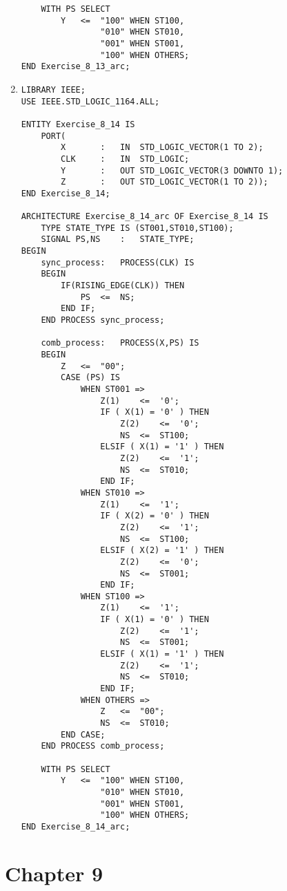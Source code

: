 \begin{enumerate}
\begin{lstlisting}
	WITH PS SELECT
		Y	<=	"100" WHEN ST100,
				"010" WHEN ST010,
				"001" WHEN ST001,
				"100" WHEN OTHERS;
END Exercise_8_13_arc;
	\end{lstlisting}
	
	\item \begin{lstlisting}
LIBRARY IEEE;
USE IEEE.STD_LOGIC_1164.ALL;

ENTITY Exercise_8_14 IS
	PORT(
		X		:	IN	STD_LOGIC_VECTOR(1 TO 2);
		CLK		:	IN	STD_LOGIC;
		Y		:	OUT	STD_LOGIC_VECTOR(3 DOWNTO 1);
		Z		:	OUT	STD_LOGIC_VECTOR(1 TO 2));
END Exercise_8_14;

ARCHITECTURE Exercise_8_14_arc OF Exercise_8_14 IS
	TYPE STATE_TYPE IS (ST001,ST010,ST100);
	SIGNAL PS,NS	:	STATE_TYPE;
BEGIN
	sync_process:	PROCESS(CLK) IS
	BEGIN
		IF(RISING_EDGE(CLK)) THEN
			PS	<=	NS;
		END IF;
	END PROCESS sync_process;
	
	comb_process:	PROCESS(X,PS) IS
	BEGIN
		Z	<=	"00";
		CASE (PS) IS
			WHEN ST001 =>
				Z(1)	<=	'0';
				IF ( X(1) = '0' ) THEN
					Z(2)	<=	'0';
					NS	<=	ST100;
				ELSIF ( X(1) = '1' ) THEN
					Z(2)	<=	'1';
					NS	<=	ST010;
				END IF;
			WHEN ST010 =>
				Z(1)	<=	'1';
				IF ( X(2) = '0' ) THEN
					Z(2)	<=	'1';
					NS	<=	ST100;
				ELSIF ( X(2) = '1' ) THEN
					Z(2)	<=	'0';
					NS	<=	ST001;
				END IF;
			WHEN ST100 =>
				Z(1)	<=	'1';
				IF ( X(1) = '0' ) THEN
					Z(2)	<=	'1';
					NS	<=	ST001;
				ELSIF ( X(1) = '1' ) THEN
					Z(2)	<=	'1';
					NS	<=	ST010;
				END IF;
			WHEN OTHERS =>
				Z	<=	"00";
				NS	<=	ST010;
		END CASE;				
	END PROCESS comb_process;
	
	WITH PS SELECT
		Y	<=	"100" WHEN ST100,
				"010" WHEN ST010,
				"001" WHEN ST001,
				"100" WHEN OTHERS;
END Exercise_8_14_arc;
	\end{lstlisting}
\end{enumerate}

\section*{Chapter 9}

